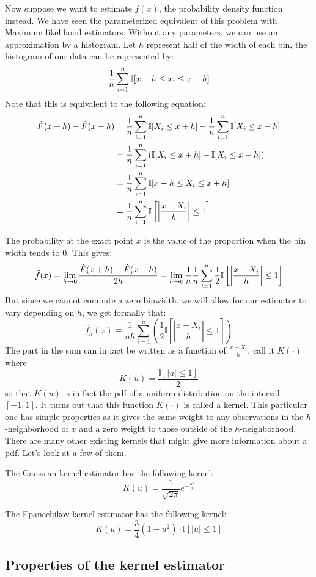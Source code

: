 Now suppose we want to estimate $f(x)$, the probability density function instead. We have seen the parameterized equivalent of this problem with Maximum likelihood estimators. Without any parameters, we can use an approximation by a histogram. Let $h$ represent half of the width of each bin, the histogram of our data can be represented by: $$\frac{1}{n} \sum_{i=1}^{n}\mathbb{I}[x - h \leq x_i \leq x +h] $$ Note that this is equivalent to the following equation:\begin{align*}
\hat F(x+h) - \hat F(x-h) & = \frac{1}{n} \sum_{i=1}^{n}\mathbb{I}[X_i\leq x+h] - \frac{1}{n} \sum_{i=1}^{n}\mathbb{I}[X_i\leq x-h] \\
& = \frac{1}{n} \sum_{i=1}^{n}\left(\mathbb{I}[X_i\leq x+h] - \mathbb{I}[X_i\leq x-h]\right) \\
& = \frac{1}{n} \sum_{i=1}^{n}\mathbb{I}[x-h\leq X_i\leq x+h] \\
& = \frac{1}{n} \sum_{i=1}^{n}\mathbb{I}\left[\left\vert\frac{x - X_i}{h}\right\vert\leq 1\right]
\end{align*}

The probability at the exact point $x$ is the value of the proportion when the bin width tends to 0. This gives: $$\hat f(x) = \lim_{h\to 0} \frac{\hat F(x+h) - \hat F(x-h)}{2h} = \lim_{h\to 0} \frac{1}{h}\frac{1}{n} \sum_{i=1}^{n}\frac{1}{2}\mathbb{I}\left[\left\vert\frac{x - X_i}{h}\right\vert\leq 1\right] $$ But since we cannot compute a zero binwidth, we will allow for our estimator to vary depending on $h$, we get formally that: $$\hat f_h(x) \equiv \frac{1}{nh}\sum_{i=1}^{n}\left(\frac{1}{2}\mathbb{I}\left[\left\vert\frac{x - X_i}{h}\right\vert\leq 1\right]\right) $$ The part in the sum can in fact be written as a function of $\frac{x - X_i}{h}$, call it $K(\cdot)$ where $$K(u) = \frac{\mathbb{I}\left[\left\vert u\right\vert\leq 1\right]}{2}$$ so that $K(u)$ is in fact the pdf of a uniform distribution on the interval $[-1, 1]$. It turns out that this function $K(\cdot)$ is called a kernel. This particular one has simple properties as it gives the same weight to any observations in the $h$-neighborhood of $x$ and a zero weight to those outside of the $h$-neighborhood. There are many other existing kernels that might give more information about a pdf. Let's look at a few of them.

The Gaussian kernel estimator has the following kernel: $$K(u) = \frac{1}{\sqrt{2\pi}} e^{-\frac{u^2}{2}}$$

The Epanechikov kernel estimator has the following kernel: $$K(u) = \frac{3}{4} (1 - u^2)\cdot\mathbb{I}[\vert u \vert \leq 1] $$

\subsection{Properties of the kernel estimator}

